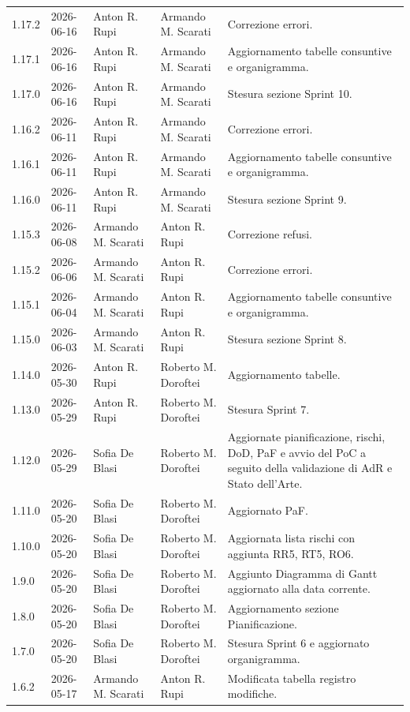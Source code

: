 \begin{longtable}{>{\ttfamily\small}l l l l >{\raggedright\arraybackslash}p{4cm}}
    1.17.2 & 2026-06-16 & Anton R. Rupi & Armando M. Scarati & Correzione errori. \\
    1.17.1 & 2026-06-16 & Anton R. Rupi & Armando M. Scarati & Aggiornamento tabelle consuntive e organigramma. \\
    1.17.0 & 2026-06-16 & Anton R. Rupi & Armando M. Scarati  & Stesura sezione Sprint 10. \\
    1.16.2 & 2026-06-11 & Anton R. Rupi & Armando M. Scarati & Correzione errori. \\
    1.16.1 & 2026-06-11 & Anton R. Rupi & Armando M. Scarati & Aggiornamento tabelle consuntive e organigramma. \\
    1.16.0 & 2026-06-11 & Anton R. Rupi & Armando M. Scarati  & Stesura sezione Sprint 9. \\
    1.15.3 & 2026-06-08 & Armando M. Scarati & Anton R. Rupi & Correzione refusi. \\
    1.15.2 & 2026-06-06 & Armando M. Scarati & Anton R. Rupi & Correzione errori. \\
    1.15.1 & 2026-06-04 & Armando M. Scarati & Anton R. Rupi & Aggiornamento tabelle consuntive e organigramma. \\
    1.15.0 & 2026-06-03 & Armando M. Scarati & Anton R. Rupi & Stesura sezione Sprint 8. \\
    1.14.0 & 2026-05-30 & Anton R. Rupi & Roberto M. Doroftei & Aggiornamento tabelle. \\
    1.13.0 & 2026-05-29 & Anton R. Rupi & Roberto M. Doroftei & Stesura Sprint 7. \\
    1.12.0 & 2026-05-29 & Sofia De Blasi & Roberto M. Doroftei & Aggiornate pianificazione, rischi, DoD, PaF e avvio del PoC a seguito della validazione di AdR e Stato dell'Arte. \\
	1.11.0 & 2026-05-20 & Sofia De Blasi & Roberto M. Doroftei & Aggiornato PaF. \\
	1.10.0 & 2026-05-20 & Sofia De Blasi & Roberto M. Doroftei & Aggiornata lista rischi con aggiunta RR5, RT5, RO6. \\
	1.9.0 & 2026-05-20 & Sofia De Blasi & Roberto M. Doroftei & Aggiunto Diagramma di Gantt aggiornato alla data corrente. \\
	1.8.0 & 2026-05-20 & Sofia De Blasi & Roberto M. Doroftei & Aggiornamento sezione Pianificazione. \\
	1.7.0 & 2026-05-20 & Sofia De Blasi & Roberto M. Doroftei & Stesura Sprint 6 e aggiornato organigramma. \\
	1.6.2 & 2026-05-17 & Armando M. Scarati & Anton R. Rupi & Modificata tabella registro modifiche. \\

\end{longtable}
